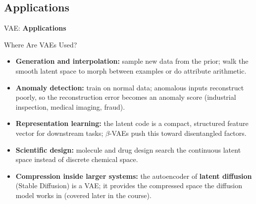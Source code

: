 \subsection{Applications}
\begin{frame}{}
	\LARGE VAE: \textbf{Applications}
\end{frame}

\begin{frame}{Where Are VAEs Used?}
\begin{itemize}
    \item \textbf{Generation and interpolation:} sample new data from the prior; walk the smooth latent space to morph between examples or do attribute arithmetic.
    \item \textbf{Anomaly detection:} train on normal data; anomalous inputs reconstruct poorly, so the reconstruction error becomes an anomaly score (industrial inspection, medical imaging, fraud).
    \item \textbf{Representation learning:} the latent code is a compact, structured feature vector for downstream tasks; $\beta$-VAEs push this toward disentangled factors.
    \item \textbf{Scientific design:} molecule and drug design search the continuous latent space instead of discrete chemical space.
    \item \textbf{Compression inside larger systems:} the autoencoder of \textbf{latent diffusion} (Stable Diffusion) is a VAE; it provides the compressed space the diffusion model works in (covered later in the course).
\end{itemize}
\end{frame}
